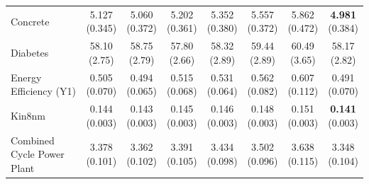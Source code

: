 {\begin{longtable}{lccccccc}
Concrete & \makecell{5.127\\{\tiny (0.345)}} & \makecell{5.060\\{\tiny (0.372)}} & \makecell{5.202\\{\tiny (0.361)}} & \makecell{5.352\\{\tiny (0.380)}} & \makecell{5.557\\{\tiny (0.372)}} & \makecell{5.862\\{\tiny (0.472)}} & \makecell{\textbf{4.981}\\{\tiny (0.384)}} \\
Diabetes & \makecell{58.10\\{\tiny (2.75)}} & \makecell{58.75\\{\tiny (2.79)}} & \makecell{57.80\\{\tiny (2.66)}} & \makecell{58.32\\{\tiny (2.89)}} & \makecell{59.44\\{\tiny (2.89)}} & \makecell{60.49\\{\tiny (3.65)}} & \makecell{58.17\\{\tiny (2.82)}} \\
Energy Efficiency (Y1) & \makecell{0.505\\{\tiny (0.070)}} & \makecell{0.494\\{\tiny (0.065)}} & \makecell{0.515\\{\tiny (0.068)}} & \makecell{0.531\\{\tiny (0.064)}} & \makecell{0.562\\{\tiny (0.082)}} & \makecell{0.607\\{\tiny (0.112)}} & \makecell{0.491\\{\tiny (0.070)}} \\
Kin8nm & \makecell{0.144\\{\tiny (0.003)}} & \makecell{0.143\\{\tiny (0.003)}} & \makecell{0.145\\{\tiny (0.003)}} & \makecell{0.146\\{\tiny (0.003)}} & \makecell{0.148\\{\tiny (0.003)}} & \makecell{0.151\\{\tiny (0.003)}} & \makecell{\textbf{0.141}\\{\tiny (0.003)}} \\
Combined Cycle Power Plant & \makecell{3.378\\{\tiny (0.101)}} & \makecell{3.362\\{\tiny (0.102)}} & \makecell{3.391\\{\tiny (0.105)}} & \makecell{3.434\\{\tiny (0.098)}} & \makecell{3.502\\{\tiny (0.096)}} & \makecell{3.638\\{\tiny (0.115)}} & \makecell{3.348\\{\tiny (0.104)}} \\

\end{longtable}}
